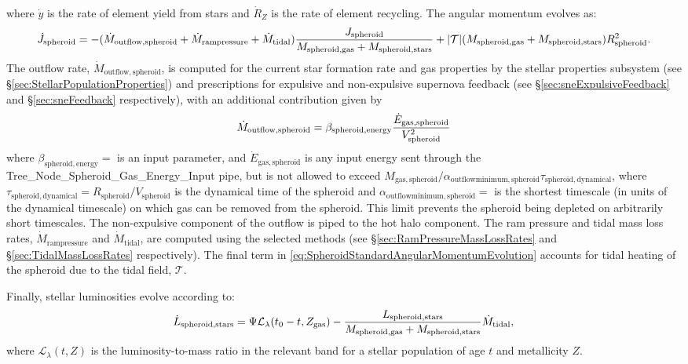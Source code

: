 where $\dot{y}$ is the rate of element yield from stars and $\dot{R}_Z$ is the rate of element recycling. The angular momentum evolves as:
\begin{equation}
 \dot{J}_\mathrm{spheroid} = - (\dot{M}_\mathrm{outflow, spheroid} + \dot{M}_\mathrm{ram pressure}+\dot{M}_\mathrm{tidal}) {J_\mathrm{spheroid} \over M_\mathrm{spheroid, gas} + M_\mathrm{spheroid, stars}} + |\mathcal{T}| ( M_\mathrm{spheroid, gas} + M_\mathrm{spheroid, stars} ) R_\mathrm{spheroid}^2.
 \label{eq:SpheroidStandardAngularMomentumEvolution}
\end{equation}
The outflow rate, $\dot{M}_\mathrm{outflow, spheroid}$, is computed for the current star formation rate and gas properties by the stellar properties subsystem (see \S\ref{sec:StellarPopulationProperties}) and prescriptions for expulsive and non-expulsive supernova feedback (see \S\ref{sec:sneExpulsiveFeedback} and \S\ref{sec:sneFeedback} respectively), with an additional contribution given by
\begin{equation}
 \dot{M}_\mathrm{outflow, spheroid} = \beta_\mathrm{spheroid, energy} {\dot{E}_\mathrm{gas, spheroid} \over V_\mathrm{spheroid}^2}
\end{equation}
where $\beta_\mathrm{spheroid, energy}=${\normalfont \ttfamily [spheroidEnergeticOutflowMassRate]} is an input parameter, and $\dot{E}_\mathrm{gas,spheroid}$ is any input energy sent through the {\normalfont \ttfamily Tree\_Node\_Spheroid\_Gas\_Energy\_Input} pipe, but is not allowed to exceed $M_\mathrm{gas, spheroid}/ \alpha_\mathrm{outflow minimum, spheroid} \tau_\mathrm{spheroid, dynamical}$, where $\tau_\mathrm{spheroid, dynamical}=R_\mathrm{spheroid}/V_\mathrm{spheroid}$ is the dynamical time of the spheroid and $\alpha_\mathrm{outflow minimum, spheroid}=${\normalfont \ttfamily [spheroidOutflowTimescaleMinimum]} is the shortest timescale (in units of the dynamical timescale) on which gas can be removed from the spheroid. This limit prevents the spheroid being depleted on arbitrarily short timescales. The non-expulsive \gls{component} of the outflow is piped to the hot halo component. The ram pressure and tidal mass loss rates, $\dot{M}_\mathrm{ram pressure}$ and $\dot{M}_\mathrm{tidal}$, are computed using the selected methods (see \S\ref{sec:RamPressureMassLossRates} and \S\ref{sec:TidalMassLossRates} respectively). The final term in \ref{eq:SpheroidStandardAngularMomentumEvolution} accounts for tidal heating of the spheroid due to the tidal field, $\mathcal{T}$.

Finally, stellar luminosities evolve according to:
\begin{equation}
\dot{L}_\mathrm{spheroid, stars} = \Psi \mathcal{L}_\lambda(t_0-t,Z_\mathrm{gas}) - {L_\mathrm{spheroid, stars} \over M_\mathrm{spheroid, gas} + M_\mathrm{spheroid, stars}} \dot{M}_\mathrm{tidal},
\end{equation}
where $\mathcal{L}_\lambda(t,Z)$ is the luminosity-to-mass ratio in the relevant band for a stellar population of age $t$ and metallicity $Z$.

